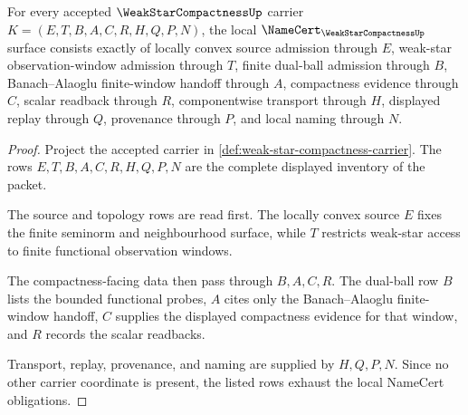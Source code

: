 \begin{theorem}
\label{thm:weak-star-compactness-namecert-obligations}
For every accepted $\WeakStarCompactnessUp$ carrier $K=(E,T,B,A,C,R,H,Q,P,N)$, the local $\NameCert_{\WeakStarCompactnessUp}$ surface consists exactly of locally convex source admission through $E$, weak-star observation-window admission through $T$, finite dual-ball admission through $B$, Banach--Alaoglu finite-window handoff through $A$, compactness evidence through $C$, scalar readback through $R$, componentwise transport through $H$, displayed replay through $Q$, provenance through $P$, and local naming through $N$.
\end{theorem}
\begin{proof}
Project the accepted carrier in \autoref{def:weak-star-compactness-carrier}. The rows $E,T,B,A,C,R,H,Q,P,N$ are the complete displayed inventory of the packet.

The source and topology rows are read first. The locally convex source $E$ fixes the finite seminorm and neighbourhood surface, while $T$ restricts weak-star access to finite functional observation windows.

The compactness-facing data then pass through $B,A,C,R$. The dual-ball row $B$ lists the bounded functional probes, $A$ cites only the Banach--Alaoglu finite-window handoff, $C$ supplies the displayed compactness evidence for that window, and $R$ records the scalar readbacks.

Transport, replay, provenance, and naming are supplied by $H,Q,P,N$. Since no other carrier coordinate is present, the listed rows exhaust the local NameCert obligations.
\end{proof}

